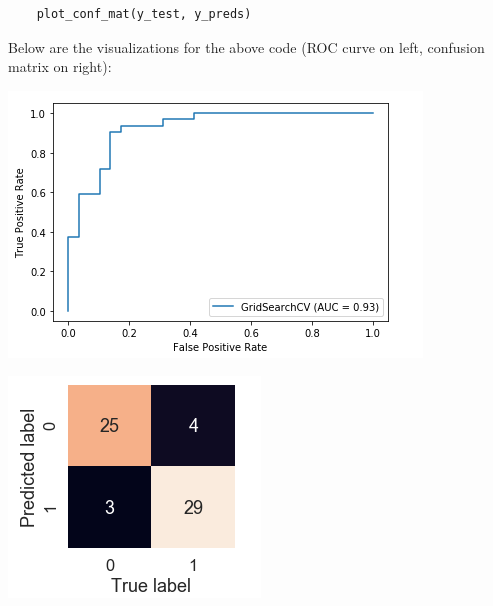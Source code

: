 \documentclass[11pt, a4paper]{article}
\begin{document}
\begin{spacing}{1.1}
\begin{lstlisting}
	plot_conf_mat(y_test, y_preds) \end{lstlisting} \vspace*{1mm}
	Below are the visualizations for the above code (ROC curve on left, confusion matrix on right): \\
	\begin{minipage}[c]{9cm}
	\includegraphics[scale=.8]{roc_mp}
	\end{minipage}
	\begin{minipage}[c]{8cm}
	\includegraphics[scale=.8]{conf_mat_mp}
	\end{minipage} \newpage
	

\end{spacing}
\end{document}
